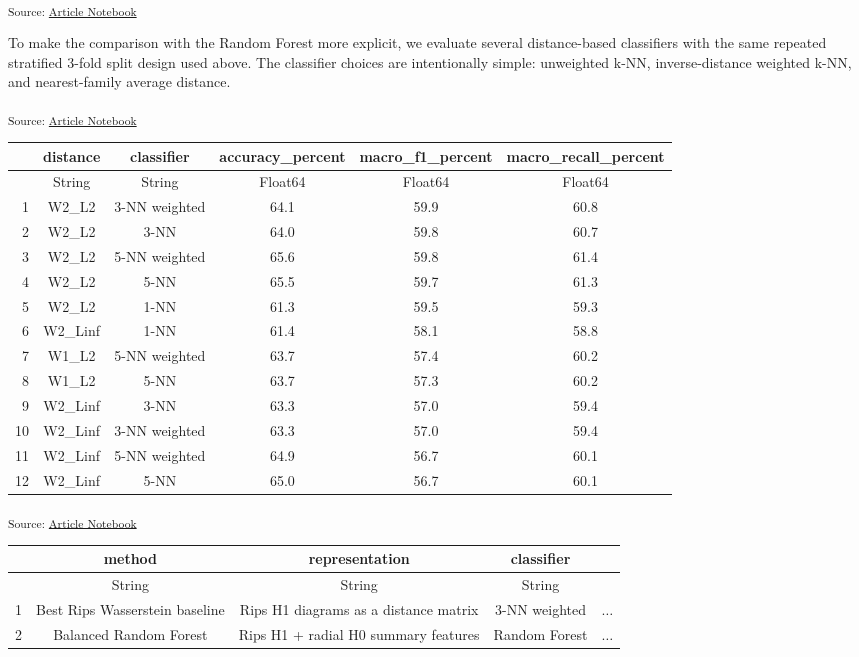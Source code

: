 \documentclass[
  a4paper,
  DIV=11,
  numbers=noendperiod]{scrartcl}
\begin{document}
\textsubscript{Source:
\href{https://JuliaTDA.github.io/tda-fly/index.qmd.html}{Article
Notebook}}

To make the comparison with the Random Forest more explicit, we evaluate
several distance-based classifiers with the same repeated stratified
3-fold split design used above. The classifier choices are intentionally
simple: unweighted k-NN, inverse-distance weighted k-NN, and
nearest-family average distance.

\textsubscript{Source:
\href{https://JuliaTDA.github.io/tda-fly/index.qmd.html}{Article
Notebook}}

\begin{tabular}{r|ccccc}
    & distance & classifier & accuracy\_percent & macro\_f1\_percent & macro\_recall\_percent\\
    \hline
    & String & String & Float64 & Float64 & Float64\\
    \hline
    1 & W2\_L2 & 3-NN weighted & 64.1 & 59.9 & 60.8 \\
    2 & W2\_L2 & 3-NN & 64.0 & 59.8 & 60.7 \\
    3 & W2\_L2 & 5-NN weighted & 65.6 & 59.8 & 61.4 \\
    4 & W2\_L2 & 5-NN & 65.5 & 59.7 & 61.3 \\
    5 & W2\_L2 & 1-NN & 61.3 & 59.5 & 59.3 \\
    6 & W2\_Linf & 1-NN & 61.4 & 58.1 & 58.8 \\
    7 & W1\_L2 & 5-NN weighted & 63.7 & 57.4 & 60.2 \\
    8 & W1\_L2 & 5-NN & 63.7 & 57.3 & 60.2 \\
    9 & W2\_Linf & 3-NN & 63.3 & 57.0 & 59.4 \\
    10 & W2\_Linf & 3-NN weighted & 63.3 & 57.0 & 59.4 \\
    11 & W2\_Linf & 5-NN weighted & 64.9 & 56.7 & 60.1 \\
    12 & W2\_Linf & 5-NN & 65.0 & 56.7 & 60.1 \\
\end{tabular}

\textsubscript{Source:
\href{https://JuliaTDA.github.io/tda-fly/index.qmd.html}{Article
Notebook}}

\begin{tabular}{r|cccc}
    & method & representation & classifier & \\
    \hline
    & String & String & String & \\
    \hline
    1 & Best Rips Wasserstein baseline & Rips H1 diagrams as a distance matrix & 3-NN weighted & $\dots$ \\
    2 & Balanced Random Forest & Rips H1 + radial H0 summary features & Random Forest & $\dots$ \\
\end{tabular}
\end{document}
